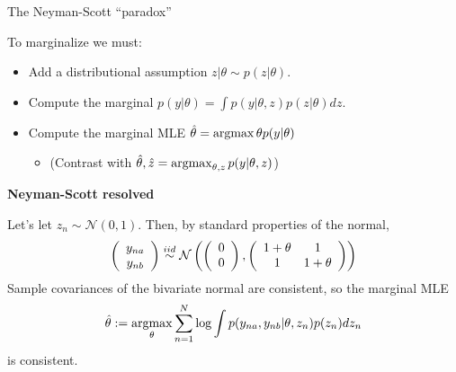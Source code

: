 \begin{frame}{The Neyman-Scott ``paradox''}

To marginalize we must:

\begin{itemize}
\item Add a distributional assumption $z | \theta \sim p(z \vert \theta)$.
\item Compute the marginal $p(y | \theta) = \int p(y | \theta, z) p(z \vert \theta) d z$.
\item Compute the marginal MLE $\hat\theta = \operatorname*{\mathrm{argmax}}{\theta} p(y | \theta)$
\begin{itemize}
    \item (Contrast with $\hat\theta, \hat{z} = \operatorname*{\mathrm{argmax}}_{\theta, z} p(y | \theta, z)$)
\end{itemize}
\end{itemize}


\pause
\textbf{Neyman-Scott resolved}

Let's let $z_n \sim \mathcal{N}(0, 1)$.  Then, by standard properties of the
normal,
%
\begin{align*}
%
\left(
\begin{array}{c}
    y_{na} \\
    y_{nb}
\end{array}
\right)
\iid
\mathcal{N}\left(
\left(
\begin{array}{c}
    0 \\
    0
\end{array}
\right),
%
\left(
\begin{array}{cc}
    1 + \theta& 1 \\
    1& 1 + \theta \\
\end{array}
\right)
%
\right)
%
\end{align*}
%
Sample covariances of the bivariate normal are consistent, so the marginal MLE
%
\begin{align*}
%
\thetahat := \argmax_\theta \sumn \log \int p(y_{na}, y_{nb} | \theta, z_n) p(z_n) dz_n
%
\end{align*}
%
is consistent.

\end{frame}
